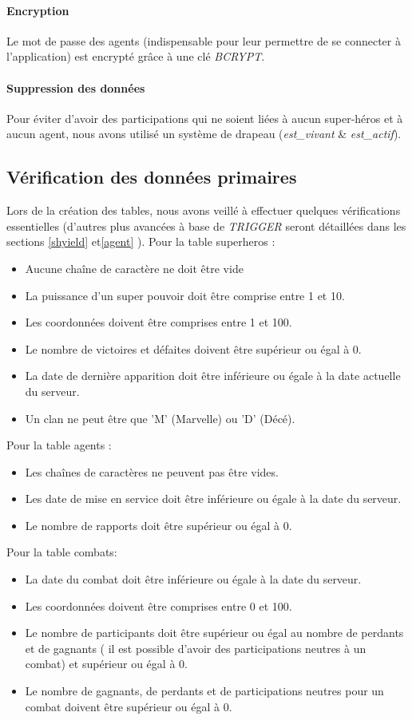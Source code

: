 \documentclass{article}[12pt]
\begin{document}
	\paragraph{Encryption}
	Le mot de passe des agents (indispensable pour leur permettre de se connecter à l'application) est encrypté grâce à une clé \textit{BCRYPT}.
	\paragraph{Suppression des données}
	Pour éviter d'avoir des participations qui ne soient liées à aucun super-héros et à aucun agent, nous avons utilisé un système de drapeau (\textit{est\_vivant} \& \textit{est\_actif}).
	
	\subsection{Vérification des données primaires}
	Lors de la création des tables, nous avons veillé à effectuer quelques vérifications essentielles (d'autres plus avancées à base de \textit{TRIGGER} seront détaillées dans les sections \ref{shyield} et\ref{agent} ).
	Pour la table superheros : 
	\begin{itemize}
		\item Aucune chaîne de caractère ne doit être vide
		\item La puissance d'un super pouvoir doit être comprise entre 1 et 10.
		\item Les coordonnées doivent être comprises entre 1 et 100.
		\item Le nombre de victoires et défaites doivent être supérieur ou égal à 0.
		\item La date de dernière apparition doit être inférieure ou égale à la date actuelle du serveur.
        \item Un clan ne peut être que 'M' (Marvelle) ou 'D' (Décé).
	\end{itemize}
	Pour la table agents :
	\begin{itemize}
		\item Les chaînes de caractères ne peuvent pas être vides.
		\item Les date de mise en service doit être inférieure ou égale à la date du serveur.
		\item Le nombre de rapports doit être supérieur ou égal à 0.
	\end{itemize}
	Pour la table combats:
	\begin{itemize}
		\item La date du combat doit être inférieure  ou égale à la date du serveur.
		\item Les coordonnées doivent être comprises entre 0 et 100.
		\item Le nombre de participants doit être supérieur ou égal au nombre de perdants et de gagnants ( il est possible d'avoir des participations neutres à un combat) et supérieur ou égal à 0.
		\item Le nombre de gagnants, de perdants et de participations neutres pour un combat doivent être supérieur ou égal à 0.
	\end{itemize}
\end{document}
